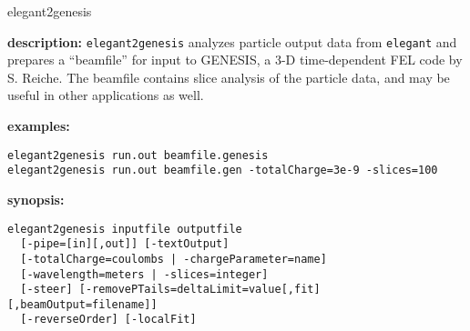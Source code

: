 \begin{sddsprog}{elegant2genesis}
  \item \textbf{description:}
  \verb|elegant2genesis| analyzes particle output data from \verb|elegant| and prepares
  a ``beamfile'' for input to GENESIS\cite{GENESIS}, a 3-D time-dependent FEL code by
  S. Reiche.  The beamfile contains slice analysis of the particle data, and may be
  useful in other applications as well.

  \item \textbf{examples:}
  \begin{verbatim}
elegant2genesis run.out beamfile.genesis
elegant2genesis run.out beamfile.gen -totalCharge=3e-9 -slices=100
  \end{verbatim}

  \item \textbf{synopsis:}
  \begin{verbatim}
elegant2genesis inputfile outputfile
  [-pipe=[in][,out]] [-textOutput]
  [-totalCharge=coulombs | -chargeParameter=name]
  [-wavelength=meters | -slices=integer]
  [-steer] [-removePTails=deltaLimit=value[,fit][,beamOutput=filename]]
  [-reverseOrder] [-localFit]
  \end{verbatim}


\end{sddsprog}
